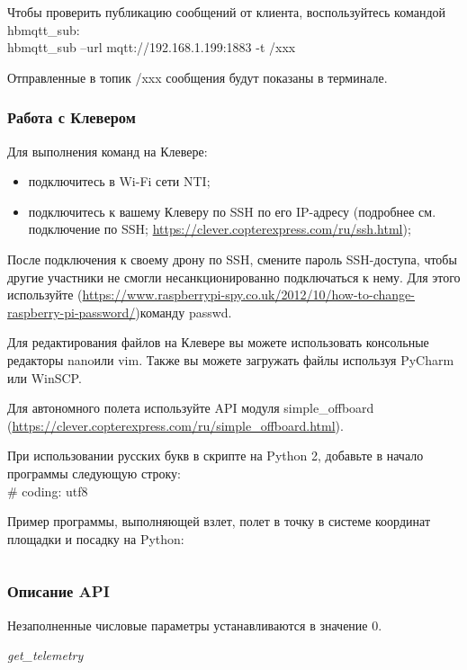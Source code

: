 Чтобы проверить публикацию сообщений от клиента, воспользуйтесь командой hbmqtt\_sub:\\
hbmqtt\_sub --url mqtt://192.168.1.199:1883 -t /xxx

Отправленные в топик /xxx сообщения будут показаны в терминале.

\subsubsection*{Работа с Клевером}

Для выполнения команд на Клевере:
\begin{itemize}
    \item подключитесь в Wi-Fi сети NTI;
    \item подключитесь к вашему Клеверу по SSH по его IP-адресу (подробнее см. подключение по SSH; \url{https://clever.copterexpress.com/ru/ssh.html});
\end{itemize}

После подключения к своему дрону по SSH, смените пароль SSH-доступа, чтобы другие участники не смогли несанкционированно подключаться к нему. Для этого используйте (\url{https://www.raspberrypi-spy.co.uk/2012/10/how-to-change-raspberry-pi-password/})команду passwd.

Для редактирования файлов на Клевере вы можете использовать консольные редакторы nanoили vim. Также вы можете загружать файлы используя PyCharm или WinSCP.

Для автономного полета используйте API модуля simple\_offboard (\url{https://clever.copterexpress.com/ru/simple_offboard.html}).

При использовании русских букв в скрипте на Python 2, добавьте в начало программы следующую строку:\\
\# coding: utf8

Пример программы, выполняющей взлет, полет в точку в системе координат площадки и посадку на Python:

\inputminted[fontsize=\footnotesize, linenos]{python}{final/command_tour/ats/task_08/source_3.py}

\subsubsection*{Описание API}

Незаполненные числовые параметры устанавливаются в значение 0.

\textit{get\_telemetry}

